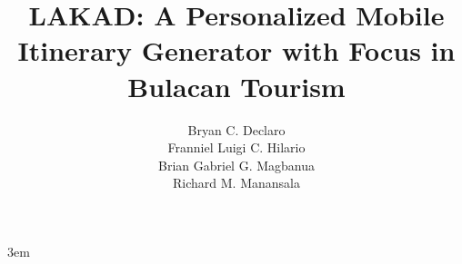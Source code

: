 \documentclass[12pt,letterpaper]{report}
\title{LAKAD: A Personalized Mobile Itinerary Generator with Focus in Bulacan Tourism}
\author{%
	Bryan C. Declaro

	Franniel Luigi C. Hilario

	Brian Gabriel G. Magbanua

	Richard M. Manansala
}
\begin{document}
\emergencystretch 3em
\sloppy
\doublespacing
\setlength{\cftbeforechapskip}{3pt}
\renewcommand{\contentsname}{TABLE OF CONTENTS}
\renewcommand{\listtablename}{LIST OF TABLES}
\renewcommand{\listfigurename}{LIST OF FIGURES}

% 	
% 	
% 	
%
%
%
%
%
%

\setcounter{chapter}{0} 

\maketitle







\printbibliography[heading=bibintoc,title={REFERENCES}]

% 
% 
\end{document}
